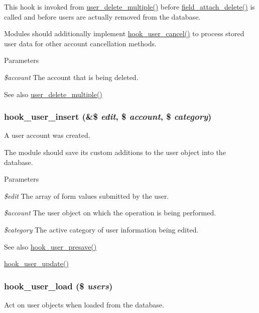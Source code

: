This hook is invoked from \hyperlink{user_8module_a3c8aa34b1ef0c113327f7151cb6f2e35}{user\_\-delete\_\-multiple()} before \hyperlink{group__field__attach_gac2e3658c9c02d0d0e71359f9ef2f207a}{field\_\-attach\_\-delete()} is called and before users are actually removed from the database.

Modules should additionally implement \hyperlink{group__hooks_gad6223ddd2f0f52c331df8a3315d9a41e}{hook\_\-user\_\-cancel()} to process stored user data for other account cancellation methods.


\begin{DoxyParams}{Parameters}
\item[{\em \$account}]The account that is being deleted.\end{DoxyParams}
\begin{DoxySeeAlso}{See also}
\hyperlink{user_8module_a3c8aa34b1ef0c113327f7151cb6f2e35}{user\_\-delete\_\-multiple()} 
\end{DoxySeeAlso}
\hypertarget{group__hooks_gaa3e2c4c972ee796d216b15da7aaf9c2c}{
\subsubsection[{hook\_\-user\_\-insert}]{\setlength{\rightskip}{0pt plus 5cm}hook\_\-user\_\-insert (\&\$ {\em edit}, \/  \$ {\em account}, \/  \$ {\em category})}}
\label{group__hooks_gaa3e2c4c972ee796d216b15da7aaf9c2c}
A user account was created.

The module should save its custom additions to the user object into the database.


\begin{DoxyParams}{Parameters}
\item[{\em \$edit}]The array of form values submitted by the user. \item[{\em \$account}]The user object on which the operation is being performed. \item[{\em \$category}]The active category of user information being edited.\end{DoxyParams}
\begin{DoxySeeAlso}{See also}
\hyperlink{group__hooks_gab6b224c35d7d97259d4350a7849f1e56}{hook\_\-user\_\-presave()} 

\hyperlink{group__hooks_gab71262402336071ef7c3d08f4c36e887}{hook\_\-user\_\-update()} 
\end{DoxySeeAlso}
\hypertarget{group__hooks_ga81027843e38de3a899fa6e72f876d6b6}{
\subsubsection[{hook\_\-user\_\-load}]{\setlength{\rightskip}{0pt plus 5cm}hook\_\-user\_\-load (\$ {\em users})}}
\label{group__hooks_ga81027843e38de3a899fa6e72f876d6b6}
Act on user objects when loaded from the database.

